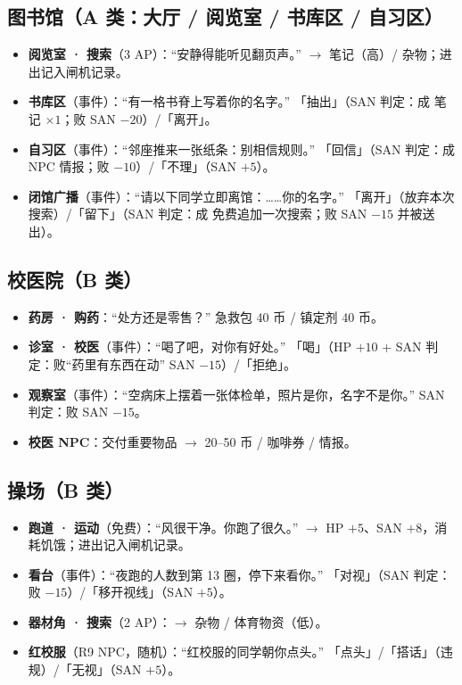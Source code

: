 \documentclass[UTF8, fontset=none, 11pt]{ctexart}
\begin{document}
\subsection{图书馆（A 类：大厅 / 阅览室 / 书库区 / 自习区）}
\begin{itemize}
  \item \textbf{阅览室 · 搜索}（3 AP）：``安静得能听见翻页声。'' $\to$ 笔记（高）/ 杂物；进出记入闸机记录。
  \item \textbf{书库区}（事件）：``有一格书脊上写着你的名字。'' 「抽出」（SAN 判定：成 笔记 $\times 1$；败 SAN $-20$）/「离开」。
  \item \textbf{自习区}（事件）：``邻座推来一张纸条：别相信规则。'' 「回信」（SAN 判定：成 NPC 情报；败 $-10$）/「不理」（SAN $+5$）。
  \item \textbf{闭馆广播}（事件）：``请以下同学立即离馆：……你的名字。'' 「离开」（放弃本次搜索）/「留下」（SAN 判定：成 免费追加一次搜索；败 SAN $-15$ 并被送出）。
\end{itemize}

\subsection{校医院（B 类）}
\begin{itemize}
  \item \textbf{药房 · 购药}：``处方还是零售？'' 急救包 40 币 / 镇定剂 40 币。
  \item \textbf{诊室 · 校医}（事件）：``喝了吧，对你有好处。'' 「喝」（HP $+10$ + SAN 判定：败``药里有东西在动'' SAN $-15$）/「拒绝」。
  \item \textbf{观察室}（事件）：``空病床上摆着一张体检单，照片是你，名字不是你。'' SAN 判定：败 SAN $-15$。
  \item \textbf{校医 NPC}：交付重要物品 $\to$ 20--50 币 / 咖啡券 / 情报。
\end{itemize}

\subsection{操场（B 类）}
\begin{itemize}
  \item \textbf{跑道 · 运动}（免费）：``风很干净。你跑了很久。'' $\to$ HP $+5$、SAN $+8$，消耗饥饿；进出记入闸机记录。
  \item \textbf{看台}（事件）：``夜跑的人数到第 13 圈，停下来看你。'' 「对视」（SAN 判定：败 $-15$）/「移开视线」（SAN $+5$）。
  \item \textbf{器材角 · 搜索}（2 AP）：$\to$ 杂物 / 体育物资（低）。
  \item \textbf{红校服}（R9 NPC，随机）：``红校服的同学朝你点头。'' 「点头」/「搭话」（违规）/「无视」（SAN $+5$）。
\end{itemize}
\end{document}
